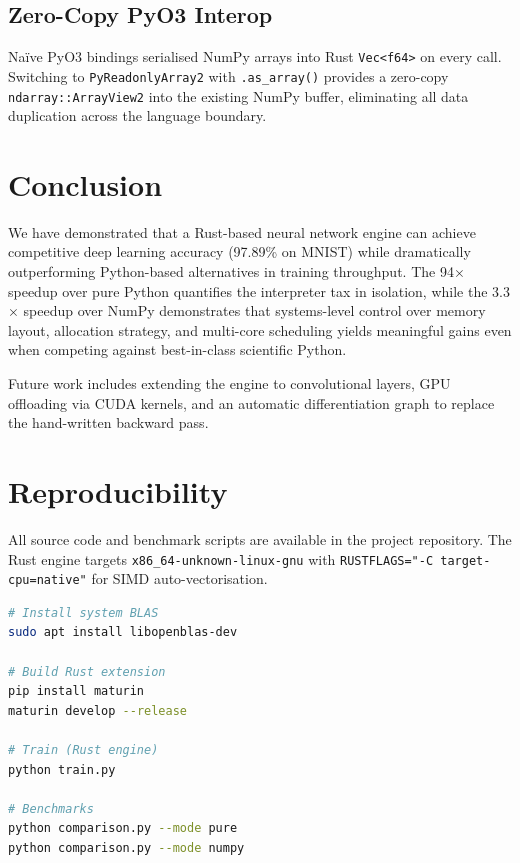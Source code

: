 \documentclass[11pt]{article}
\begin{document}
\subsection{Zero-Copy PyO3 Interop}

Na\"{i}ve PyO3 bindings serialised NumPy arrays into Rust \texttt{Vec<f64>} on every call. Switching to \texttt{PyReadonlyArray2} with \texttt{.as\_array()} provides a zero-copy \texttt{ndarray::ArrayView2} into the existing NumPy buffer, eliminating all data duplication across the language boundary.

\section{Conclusion}

We have demonstrated that a Rust-based neural network engine can achieve competitive deep learning accuracy (97.89\% on MNIST) while dramatically outperforming Python-based alternatives in training throughput. The 94$\times$ speedup over pure Python quantifies the interpreter tax in isolation, while the 3.3$\times$ speedup over NumPy demonstrates that systems-level control over memory layout, allocation strategy, and multi-core scheduling yields meaningful gains even when competing against best-in-class scientific Python.

Future work includes extending the engine to convolutional layers, GPU offloading via CUDA kernels, and an automatic differentiation graph to replace the hand-written backward pass.

\section*{Reproducibility}

All source code and benchmark scripts are available in the project repository. The Rust engine targets \texttt{x86\_64-unknown-linux-gnu} with \texttt{RUSTFLAGS="-C target-cpu=native"} for SIMD auto-vectorisation.

\begin{lstlisting}[language=bash, caption={Build and run instructions.}]
# Install system BLAS
sudo apt install libopenblas-dev

# Build Rust extension
pip install maturin
maturin develop --release

# Train (Rust engine)
python train.py

# Benchmarks
python comparison.py --mode pure
python comparison.py --mode numpy
\end{lstlisting}
\end{document}
